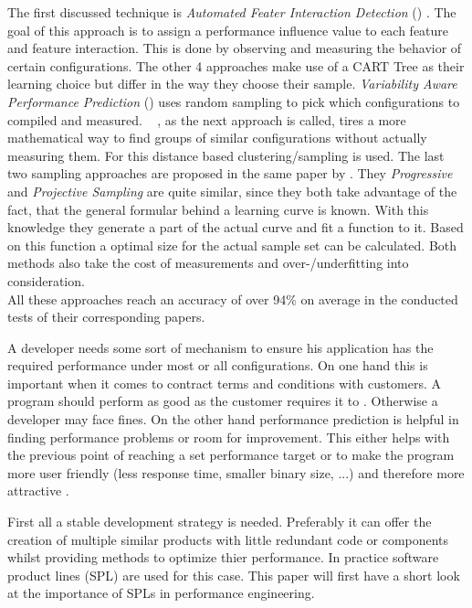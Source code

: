 The first discussed technique is \textit{Automated Feater Interaction Detection} (\AFID) \cite{AutomatedFeatureDetectionSiegmund2012}. The goal of this approach is to assign a performance influence value to each feature and feature interaction. This is done by observing and measuring the behavior of certain configurations. The other 4 approaches make use of a CART Tree as their learning choice but differ in the way they choose their sample. \textit{Variability Aware Performance Prediction} (\VAPP) \cite{VariabilityAwarePerformancePredictionJianmeiSigmundApel} uses random sampling to pick which configurations to compiled and measured. \WHAT~ \cite{DistanceBasedSampling2019}, as the next approach is called, tires a more mathematical way to find groups of similar configurations without actually measuring them. For this distance based clustering/sampling is used. The last two sampling approaches are proposed in the same paper by \citet{CostEfficientSampling_Gou_Siegmund_2015}. They \textit{Progressive} and \textit{Projective Sampling} are quite similar, since they both take advantage of the fact, that the general formular behind a learning curve is known. With this knowledge they generate a part of the actual curve and fit a function to it. Based on this function a optimal size for the actual sample set can be calculated. Both methods also take the cost of measurements and over-/underfitting into consideration.\\
All these approaches reach an accuracy of over 94\% on average in the conducted tests of their corresponding papers. 







A developer needs some sort of mechanism to ensure his application has the required performance under most or all configurations. On one hand this is important when it comes to contract terms and conditions with customers. A program should perform as good as the customer requires it to \cite{VariabilityAwarePerformancePredictionJianmeiSigmundApel}. Otherwise a developer may face fines. On the other hand performance prediction is helpful in finding performance problems or room for improvement. This either helps with the previous point of reaching a set performance target or to make the program more user friendly (less response time, smaller binary size, ...) and therefore more attractive \cite{SoftwareEngineeringMenschenProzesseTechniken}.

First all a stable development strategy is needed. Preferably it can offer the creation of multiple similar products with little redundant code or components whilst providing methods to optimize thier performance. In practice software product lines (SPL) are used for this case. This paper will first have a short look at the importance of SPLs in performance engineering.

